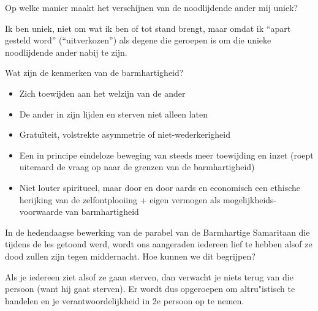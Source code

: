 \documentclass[main.tex]{subfiles}
\begin{document}
\begin{examenvraag}
    \begin{vraag}
        Op welke manier maakt het verschijnen van de noodlijdende ander mij uniek?
    \end{vraag}

    \begin{antwoord}
        Ik ben uniek, niet om wat ik ben of tot stand brengt, maar omdat ik “apart gesteld word” (“uitverkozen”) als degene die geroepen is om die unieke noodlijdende ander nabij te zijn.
    \end{antwoord}
\end{examenvraag}


\begin{examenvraag}
    \begin{vraag}
        Wat zijn de kenmerken van de barmhartigheid?
    \end{vraag}

    \begin{antwoord}
    	\begin{itemize}
	    	\item Zich toewijden aan het welzijn van de ander
	    	\item De ander in zijn lijden en sterven niet alleen laten
	    	\item Gratuïteit, volstrekte asymmetrie of niet-wederkerigheid
	    	\item Een in principe eindeloze beweging van steeds meer toewijding en inzet (roept uiteraard de vraag op naar de grenzen van de barmhartigheid)
	    	\item Niet louter spiritueel, maar door en door aards en economisch een ethische herijking van de zelfontplooiing + eigen vermogen als mogelijkheids-voorwaarde van barmhartigheid
	    	
    	\end{itemize}
    \end{antwoord}
\end{examenvraag}


\begin{examenvraag}
    \begin{vraag}
        In de hedendaagse bewerking van de parabel van de Barmhartige Samaritaan die tijdens de les getoond werd, wordt ons aangeraden iedereen lief te hebben alsof ze dood zullen zijn tegen middernacht. Hoe kunnen we dit begrijpen?
    \end{vraag}

    \begin{antwoord}
		Als je iedereen ziet alsof ze gaan sterven, dan verwacht je niets terug van die persoon (want hij gaat sterven). Er wordt dus opgeroepen om altru"istisch te handelen en je verantwoordelijkheid in 2e persoon op te nemen.
    \end{antwoord}
\end{examenvraag}
\end{document}
